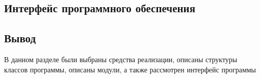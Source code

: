 %

\subsection{Интерфейс программного обеспечения}

\subsection*{Вывод}

В данном разделе были выбраны средства реализации, описаны структуры классов программы, описаны модули, а также рассмотрен интерфейс программы
